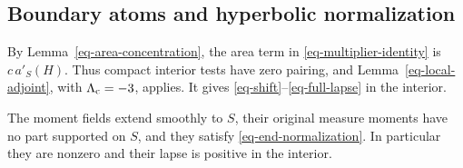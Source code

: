 \subsection{Boundary atoms and hyperbolic normalization}

By Lemma~\ref{eq-area-concentration}, the area term in
\eqref{eq-multiplier-identity} is \(c\,a'_S(H)\).
Thus compact interior tests have zero pairing, and
Lemma~\ref{eq-local-adjoint}, with \(\Lambda_{\rm c}=-3\), applies.
It gives \eqref{eq-shift}--\eqref{eq-full-lapse} in the interior.

\begin{lemma}
\label{eq-normalization-lemma}
The moment fields extend smoothly to \(S\), their original measure
moments have no part supported on \(S\), and they satisfy
\eqref{eq-end-normalization}.  In particular they are nonzero and
their lapse is positive in the interior.
\end{lemma}

